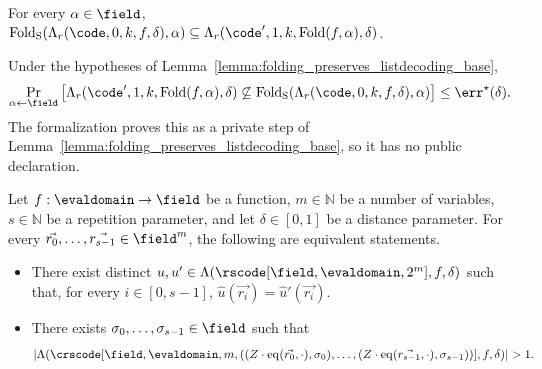 \begin{lemma}\label{lemma:folding_preserves_listdecoding_bound}
\leanok
{}
    For every $\alpha \in \field$, $\mathrm{Fold_S}(\Lambda_{r}(\code, 0, k, f, \delta), \alpha) \subseteq \Lambda_{r}(\code', 1, k, \mathrm{Fold}(f, \alpha), \delta)$.
\end{lemma}

\begin{lemma}\label{lemma:folding_preserves_listdecoding_base_ne_subset}
    Under the hypotheses of Lemma~\ref{lemma:folding_preserves_listdecoding_base},
    \[
    \Pr_{\alpha \leftarrow \field} \left[
    \Lambda_{r}(\code', 1, k, \mathrm{Fold}(f, \alpha), \delta)
    \not\subseteq \mathrm{Fold_S}(\Lambda_{r}(\code, 0, k, f, \delta), \alpha)
    \right] \le \err^\star(\delta).
    \]
    The formalization proves this as a private step of
    Lemma~\ref{lemma:folding_preserves_listdecoding_base}, so it has no public declaration.
\end{lemma}

\begin{lemma}\label{lemma:crs_equiv_rs_randpompt_agreement}
    Let $f : \evaldomain \rightarrow \field$ be a function, $m \in \mathbb{N}$ be a number of variables, $s \in \mathbb{N}$ be a repetition parameter, and let $\delta \in [0,1]$ be a distance parameter. For every $\vec{r_0}, \dots, \vec{r_{s-1}} \in \field^m$, the following are equivalent statements.
\begin{itemize}
    \item There exist distinct $u, u' \in \Lambda(\rscode[\field, \evaldomain, 2^m], f, \delta)$ such that, for every $i \in [0,s-1]$, $\hat{u}(\vec{r_i}) = \hat{u}'(\vec{r_i})$.
    \item There exists $\sigma_0, \dots, \sigma_{s-1} \in \field$ such that $$\left| \Lambda(\crscode[\field, \evaldomain, m, ((Z \cdot \mathrm{eq}(\vec{r_0}, \cdot), \sigma_0), \dots, (Z \cdot \mathrm{eq}(\vec{r_{s-1}}, \cdot), \sigma_{s-1}))], f, \delta) \right| > 1.$$
\end{itemize}
\end{lemma}

